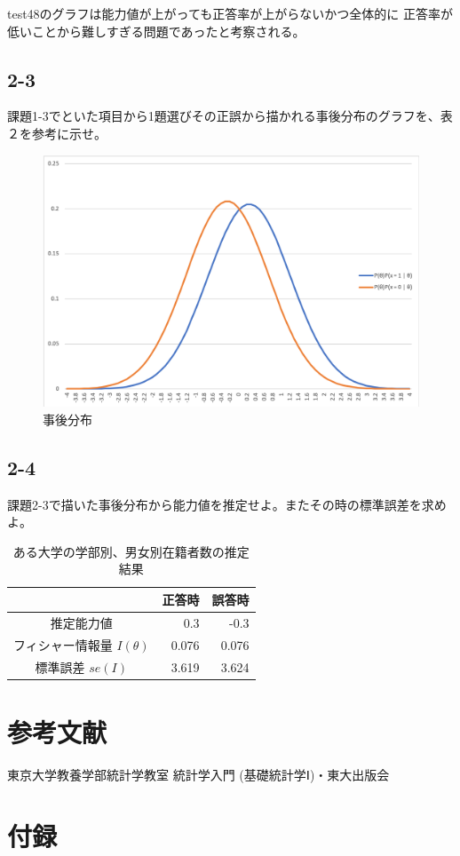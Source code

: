 \documentclass{jsarticle}
\begin{document}
test48のグラフは能力値が上がっても正答率が上がらないかつ全体的に
正答率が低いことから難しすぎる問題であったと考察される。

\subsection{2-3}
課題1-3でといた項目から1題選びその正誤から描かれる事後分布のグラフを、表２を参考に示せ。

\begin{figure}[H]
  \centering
  \includegraphics[width=12cm]{./key2.png}
  \caption{事後分布}
\end{figure}

\subsection{2-4}
課題2-3で描いた事後分布から能力値を推定せよ。またその時の標準誤差を求めよ。

    \begin{table}[htb]
      \begin{center}
        \caption{ある大学の学部別、男女別在籍者数の推定結果}
        {\scriptsize
        \begin{tabular}{|c|r|r|} \hline
                                       & 正答時 & 誤答時   \\ \hline
          推定能力値                   & 0.3    & -0.3     \\
          フィシャー情報量 $I(\theta)$ & 0.076  & 0.076    \\
          標準誤差 $se(I)$             & 3.619  & 3.624  \\ \hline
        \end{tabular}
        }
      \end{center}
    \end{table}


\section{参考文献}
\begin{thebibliography}{9}
   東京大学教養学部統計学教室 統計学入門 (基礎統計学Ⅰ)・東大出版会
\end{thebibliography}

\section{付録}
\end{document}

